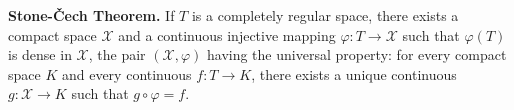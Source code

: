 \textbf{Stone-Čech Theorem.} If $T$ is a completely regular space, there exists a compact space $\mathcal{X}$ and a continuous injective mapping $\varphi: T \to \mathcal{X}$ such that $\varphi(T)$ is dense in $\mathcal{X}$, the pair $(\mathcal{X}, \varphi)$ having the universal property: for every compact space $K$ and every continuous $f: T \to K$, there exists a unique continuous $g: \mathcal{X} \to K$ such that $g \circ \varphi = f$.
